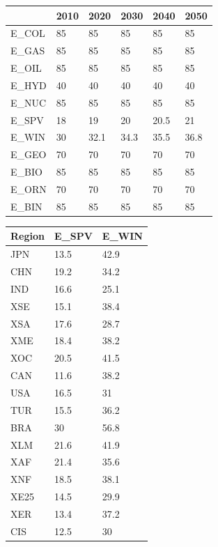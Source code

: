 \documentclass[10pt,a4paper,titlepage,dvipdfmx]{book}
\begin{document}
\begin{tabularx}{\textwidth}{|
p{}|
p{}|
p{}|
p{}|
p{}|
p{}|} 
\caption{\label{tab:CapFac}Capacity factor (\%)}\\
\hline 
  & 2010 & 2020 & 2030 & 2040 & 2050 \\\hline 
E\_COL & 85 & 85 & 85 & 85 & 85 \\\hline 
E\_GAS & 85 & 85 & 85 & 85 & 85 \\\hline 
E\_OIL & 85 & 85 & 85 & 85 & 85 \\\hline 
E\_HYD & 40 & 40 & 40 & 40 & 40 \\\hline 
E\_NUC & 85 & 85 & 85 & 85 & 85 \\\hline 
E\_SPV & 18 & 19 & 20 & 20.5 & 21 \\\hline 
E\_WIN & 30 & 32.1 & 34.3 & 35.5 & 36.8 \\\hline 
E\_GEO & 70 & 70 & 70 & 70 & 70 \\\hline 
E\_BIO & 85 & 85 & 85 & 85 & 85 \\\hline 
E\_ORN & 70 & 70 & 70 & 70 & 70 \\\hline 
E\_BIN & 85 & 85 & 85 & 85 & 85 \\\hline 
\end{tabularx}

\begin{tabularx}{\textwidth}{|
p{}|
p{}|
p{}|} 
\caption{\label{tab:CapFacReg}Capacity factors for VRE by regions (\%)}\\
\hline 
Region & E\_SPV & E\_WIN \\\hline 
JPN & 13.5 & 42.9 \\\hline
CHN & 19.2 & 34.2 \\\hline
IND & 16.6 & 25.1 \\\hline
XSE & 15.1 & 38.4 \\\hline
XSA & 17.6 & 28.7 \\\hline
XME & 18.4 & 38.2 \\\hline
XOC & 20.5 & 41.5 \\\hline
CAN & 11.6 & 38.2 \\\hline
USA & 16.5 & 31 \\\hline
TUR & 15.5 & 36.2 \\\hline
BRA & 30 & 56.8 \\\hline
XLM & 21.6 & 41.9 \\\hline
XAF & 21.4 & 35.6 \\\hline
XNF & 18.5 & 38.1 \\\hline
XE25 & 14.5 & 29.9 \\\hline
XER & 13.4 & 37.2 \\\hline
CIS & 12.5 & 30 \\\hline
\end{tabularx}
\end{document}
